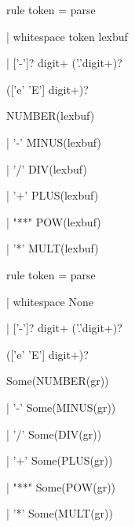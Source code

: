 \begin{figure} %


\begin{minipage}[t]{61mm}


\begin{center}


\begin{boxedverbatim}


rule token = parse


| whitespace { token lexbuf }


| ['-']? digit+ ('.'digit+)?


  (['e' 'E'] digit+)?


       { NUMBER(lexbuf) }


| '-'  { MINUS(lexbuf) }


| '/'  { DIV(lexbuf) }


| '+'  { PLUS(lexbuf) }


| "**" { POW(lexbuf) }


| '*'  { MULT(lexbuf) }


\end{boxedverbatim}


\end{center}


\vspace*{-6pt}






\end{minipage}


\hfill




\begin{minipage}[t]{61mm}


\begin{center}


\begin{boxedverbatim}


rule token = parse


| whitespace { None }


| ['-']? digit+ ('.'digit+)?


  (['e' 'E'] digit+)?


       { Some(NUMBER(gr)) }


| '-'  { Some(MINUS(gr)) }


| '/'  { Some(DIV(gr)) }


| '+'  { Some(PLUS(gr)) }


| "**" { Some(POW(gr)) }


| '*'  { Some(MULT(gr)) }


\end{boxedverbatim}


\end{center}


\vspace*{-9pt}




\end{minipage}


\end{figure}





